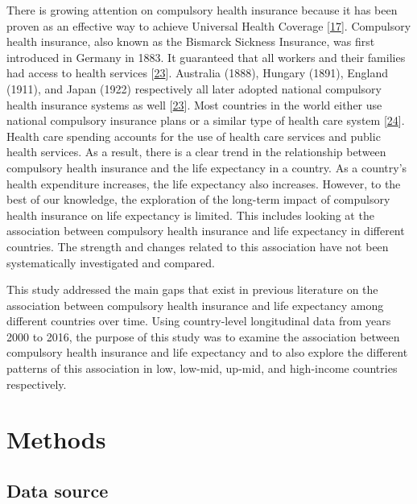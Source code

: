 \documentclass[]{elsarticle} %
\begin{document}
There is growing attention on compulsory health insurance because it has been proven as an effective way to achieve Universal Health Coverage {[}\protect\hyperlink{ref-wagstaff2018progress}{17}{]}.
Compulsory health insurance, also known as the Bismarck Sickness Insurance, was first introduced in Germany in 1883.
It guaranteed that all workers and their families had access to health services {[}\protect\hyperlink{ref-walker1969compulsory}{23}{]}.
Australia (1888), Hungary (1891), England (1911), and Japan (1922) respectively all later adopted national compulsory health insurance systems as well {[}\protect\hyperlink{ref-walker1969compulsory}{23}{]}.
Most countries in the world either use national compulsory insurance plans or a similar type of health care system {[}\protect\hyperlink{ref-healthglance2017}{24}{]}.
Health care spending accounts for the use of health care services and public health services.
As a result, there is a clear trend in the relationship between compulsory health insurance and the life expectancy in a country.
As a country's health expenditure increases, the life expectancy also increases.
However, to the best of our knowledge, the exploration of the long-term impact of compulsory health insurance on life expectancy is limited.
This includes looking at the association between compulsory health insurance and life expectancy in different countries.
The strength and changes related to this association have not been systematically investigated and compared.

This study addressed the main gaps that exist in previous literature on the association between compulsory health insurance and life expectancy among different countries over time. Using country-level longitudinal data from years 2000 to 2016, the purpose of this study was to examine the association between compulsory health insurance and life expectancy and to also explore the different patterns of this association in low, low-mid, up-mid, and high-income countries respectively.

\hypertarget{methods}{%
\section{Methods}\label{methods}}

\hypertarget{data-source}{%
\subsection{Data source}\label{data-source}}
\end{document}
